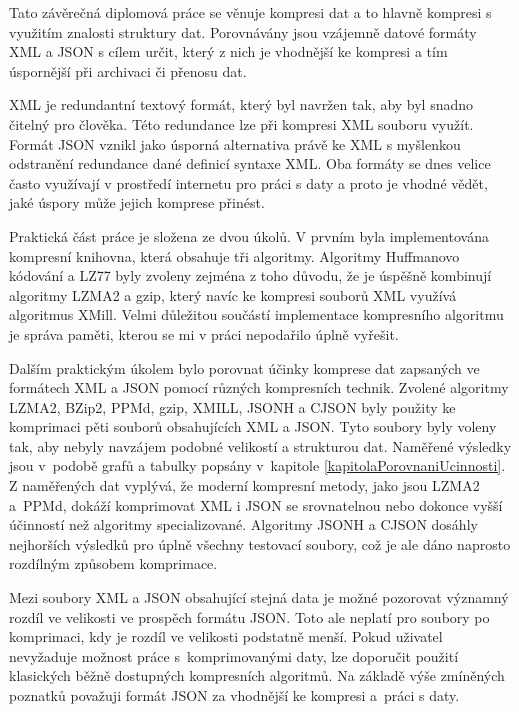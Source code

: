 

Tato závěrečná diplomová práce se věnuje kompresi dat a to hlavně kompresi s využitím znalosti struktury dat. Porovnávány jsou vzájemně datové formáty XML a JSON s cílem určit, který z nich je vhodnější ke kompresi a tím úspornější při archivaci či přenosu dat.

XML je redundantní textový formát, který byl navržen tak, aby byl snadno čitelný pro člověka. Této redundance lze při kompresi XML souboru využít. Formát JSON vznikl jako úsporná alternativa právě ke XML s myšlenkou odstranění redundance dané definicí syntaxe XML. Oba formáty se dnes velice často využívají v prostředí internetu pro práci s daty a proto je vhodné vědět, jaké úspory může jejich komprese přinést.

Praktická část práce je složena ze dvou úkolů. V prvním byla implementována kompresní knihovna, která obsahuje tři algoritmy. Algoritmy Huffmanovo kódování a LZ77 byly zvoleny zejména z toho důvodu, že je úspěšně kombinují algoritmy LZMA2 a gzip, který navíc ke kompresi souborů XML využívá algoritmus XMill. Velmi důležitou součástí implementace kompresního algoritmu je správa paměti, kterou se mi v práci nepodařilo úplně vyřešit.

Dalším praktickým úkolem bylo porovnat účinky komprese dat zapsaných ve formátech XML a JSON pomocí různých kompresních technik. Zvolené algoritmy LZMA2, BZip2, PPMd, gzip, XMILL, JSONH a CJSON byly použity ke komprimaci pěti souborů obsahujících XML a JSON. Tyto soubory byly voleny tak, aby nebyly navzájem podobné velikostí a strukturou dat. Naměřené výsledky jsou v~podobě grafů a tabulky popsány v~kapitole \ref{kapitolaPorovnaniUcinnosti}. Z naměřených dat vyplývá, že moderní kompresní metody, jako jsou LZMA2 a~PPMd, dokáží komprimovat XML i JSON se srovnatelnou nebo dokonce vyšší účinností než algoritmy specializované. Algoritmy JSONH a CJSON dosáhly nejhorších výsledků pro úplně všechny testovací soubory, což je ale dáno naprosto rozdílným způsobem komprimace.

Mezi soubory XML a JSON obsahující stejná data je možné pozorovat významný rozdíl ve velikosti ve prospěch formátu JSON. Toto ale neplatí pro soubory po komprimaci, kdy je rozdíl ve velikosti podstatně menší. Pokud uživatel nevyžaduje možnost práce s~komprimovanými daty, lze doporučit použití klasických běžně dostupných kompresních algoritmů. Na základě výše zmíněných poznatků považuji formát JSON za vhodnější ke kompresi a~práci s daty.